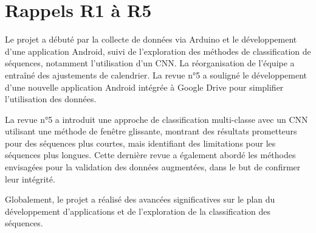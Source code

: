 \section{Rappels R1 à R5}

Le projet a débuté par la collecte de données via Arduino et le développement d'une application Android, suivi de l'exploration des méthodes de classification de séquences, notamment l'utilisation d'un CNN. La réorganisation de l'équipe a entraîné des ajustements de calendrier. La revue n°5 a souligné le développement d'une nouvelle application Android intégrée à Google Drive pour simplifier l'utilisation des données.

La revue n°5 a introduit une approche de classification multi-classe avec un CNN utilisant une méthode de fenêtre glissante, montrant des résultats prometteurs pour des séquences plus courtes, mais identifiant des limitations pour les séquences plus longues. Cette dernière revue a également  abordé les méthodes envisagées pour la validation des données augmentées, dans le but de confirmer leur intégrité. 

Globalement, le projet a réalisé des avancées significatives sur le plan du développement d'applications et de l'exploration de la classification des séquences. 
